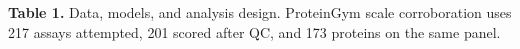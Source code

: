 \caption{{\bf Table 1.} Data, models, and analysis design. ProteinGym scale corroboration uses 217 assays attempted, 201 scored after QC, and 173 proteins on the same panel.}
